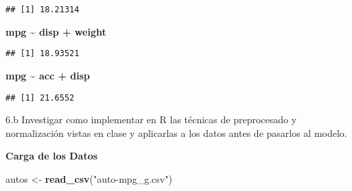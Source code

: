 \documentclass[]{article}
\newenvironment{Shaded}{\begin{snugshade}}{\end{snugshade}}
\newcommand{\DataTypeTok}[1]{\textcolor[rgb]{0.13,0.29,0.53}{#1}}
\newcommand{\KeywordTok}[1]{\textcolor[rgb]{0.13,0.29,0.53}{\textbf{#1}}}
\newcommand{\NormalTok}[1]{#1}
\newcommand{\OperatorTok}[1]{\textcolor[rgb]{0.81,0.36,0.00}{\textbf{#1}}}
\newcommand{\StringTok}[1]{\textcolor[rgb]{0.31,0.60,0.02}{#1}}
\begin{document}
\begin{verbatim}
## [1] 18.21314
\end{verbatim}

\textbf{mpg \textasciitilde{} disp + weight}

\begin{Shaded}
\end{Shaded}

\begin{verbatim}
## [1] 18.93521
\end{verbatim}

\textbf{mpg \textasciitilde{} acc + disp}

\begin{Shaded}
\end{Shaded}

\begin{verbatim}
## [1] 21.6552
\end{verbatim}

6.b Investigar como implementar en R las técnicas de preprocesado y
normalización vistas en clase y aplicarlas a los datos antes de pasarlos
al modelo.

\textbf{Carga de los Datos}

\begin{Shaded}
\begin{Highlighting}[]
\NormalTok{autos <-}\StringTok{ }\KeywordTok{read_csv}\NormalTok{(}\StringTok{"auto-mpg_g.csv"}\NormalTok{)}
\end{Highlighting}
\end{Shaded}
\end{document}
